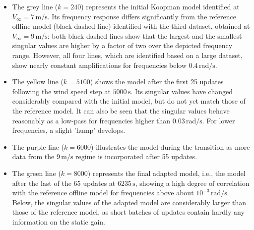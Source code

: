 \begin{itemize}
    \item The grey line ($k = 240$) represents the initial Koopman model identified at $V_{\infty} = 7\,\mathrm{m/s}$. Its frequency response differs significantly from the reference offline model (black dashed line) identified with the third dataset, obtained at $V_{\infty} = 9\,\mathrm{m/s}$: both black dashed lines show that the largest and the smallest singular values are higher by a factor of two over the depicted frequency range. However, all four lines, which are identified based on a large dataset, show nearly constant amplifications for frequencies below $0.4\,\mathrm{rad/s}$.
    \item The yellow line ($k = 5100$) shows the model after the first 25 updates following the wind speed step at $5000\,\mathrm{s}$. Its singular values have changed considerably compared with the initial model, but do not yet match those of the reference model. It can also be seen that the singular values behave reasonably as a low-pass for frequencies higher than $0.03\,\mathrm{rad/s}$. For lower frequencies, a slight 'hump' develops.
    \item The purple line ($k = 6000$) illustrates the model during the transition as more data from the $9\,\mathrm{m/s}$ regime is incorporated after 55 updates.
    \item The green line ($k = 8000$) represents the final adapted model, i.e., the model after the last of the 65 updates at $6235\,\mathrm{s}$, showing a high degree of correlation with the reference offline model for frequencies above about $10^{-3}\,\mathrm{rad/s}$. Below, the singular values of the adapted model are considerably larger than those of the reference model, as short batches of updates contain hardly any information on the static gain.
\end{itemize}

